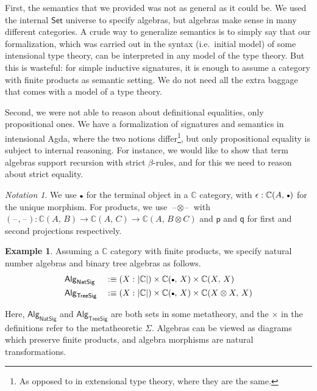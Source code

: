 \documentclass[12pt,a4paper,twoside,openany]{book}
\theoremstyle{remark}
\newtheorem{notation}{Notation}
\theoremstyle{definition}
\newtheorem{myexample}{Example}
\theoremstyle{theorem}
\newcommand{\ms}[1]{\mathsf{#1}}
\newcommand{\mbb}[1]{\mathbb{#1}}
\newcommand{\blank}{\mathord{\hspace{1pt}\text{--}\hspace{1pt}}}
\newcommand{\Set}{\mathsf{Set}}
\newcommand{\emptycon}{\scaleobj{.75}\bullet}
\newcommand{\p}{\mathsf{p}}
\newcommand{\q}{\mathsf{q}}
\newcommand{\Alg}{\ms{Alg}}
\newcommand{\mbbC}{\mbb{C}}
\newcommand{\defn}{:\equiv}
\begin{document}
First, the semantics that we provided was not as general as it could be. We
used the internal $\Set$ universe to specify algebras, but algebras make sense
in many different categories. A crude way to generalize semantics is to simply
say that our formalization, which was carried out in the syntax (i.e.\ initial
model) of some intensional type theory, can be interpreted in any model of the
type theory. But this is wasteful: for simple inductive signatures, it is
enough to assume a category with finite products as semantic setting. We do not
need all the extra baggage that comes with a model of a type theory.

Second, we were not able to reason about definitional equalities, only
propositional ones. We have a formalization of signatures and semantics in
intensional Agda, where the two notions differ\footnote{As opposed to in
extensional type theory, where they are the same.}, but only propositional
equality is subject to internal reasoning. For instance, we would like to show
that term algebras support recursion with strict $\beta$-rules, and for this we
need to reason about strict equality.

\begin{notation}
We use $\emptycon$ for the terminal object in a $\mbb{C}$ category, with
$\epsilon : \mbb{C}(A,\,\emptycon)$ for the unique morphism. For products, we
use $\blank\!\otimes\!\blank$ with $(\blank\!,\!\blank) : \mbb{C}(A,\,B) \to
\mbb{C}(A,\,C) \to \mbb{C}(A,\,B\otimes C)$ and $\p$ and $\q$ for
first and second projections respectively.
\end{notation}

\begin{myexample}
Assuming a $\mbbC$ category with finite products, we specify natural number algebras
and binary tree algebras as follows.
\begin{alignat*}{3}
  &\Alg_{\ms{NatSig}} &&\defn (X : |\mbbC|) \times \mbbC(\emptycon,\,X) \times \mbbC(X,\,X)\\
  &\Alg_{\ms{TreeSig}}&& \defn (X : |\mbbC|) \times \mbbC(\emptycon,\,X) \times \mbbC(X \otimes X,\,X)
\end{alignat*}
\end{myexample}
Here, $\Alg_{\ms{NatSig}}$ and $\Alg_{\ms{TreeSig}}$ are both sets in some
metatheory, and the $\times$ in the definitions refer to the metatheoretic
$\Sigma$. Algebras can be viewed as diagrams which preserve finite products, and
algebra morphisms are natural transformations.
\end{document}
